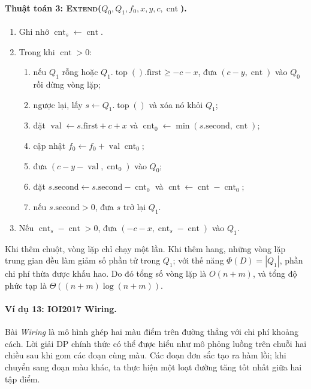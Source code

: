 \documentclass[11pt]{article}
\begin{document}
\paragraph{Thuật toán 3: \textsc{Extend}(\(Q_0,Q_1,f_0,x,y,c,\operatorname{cnt}\)).}
\begin{enumerate}
  \item Ghi nhớ \(\operatorname{cnt}_s\leftarrow \operatorname{cnt}\).
  \item Trong khi \(\operatorname{cnt}>0\):
  \begin{enumerate}
    \item nếu \(Q_1\) rỗng hoặc
    \(Q_1.\operatorname{top}().\mathrm{first}\ge -c-x\), đưa
    \((c-y,\operatorname{cnt})\) vào \(Q_0\) rồi dừng vòng lặp;
    \item ngược lại, lấy \(s\leftarrow Q_1.\operatorname{top}()\) và xóa nó
    khỏi \(Q_1\);
    \item đặt \(\operatorname{val}\leftarrow s.\mathrm{first}+c+x\) và
    \(\operatorname{cnt}_0\leftarrow
    \min(s.\mathrm{second},\operatorname{cnt})\);
    \item cập nhật \(f_0\leftarrow f_0+\operatorname{val}\operatorname{cnt}_0\);
    \item đưa \((c-y-\operatorname{val},\operatorname{cnt}_0)\) vào \(Q_0\);
    \item đặt
    \(s.\mathrm{second}\leftarrow s.\mathrm{second}-\operatorname{cnt}_0\) và
    \(\operatorname{cnt}\leftarrow \operatorname{cnt}-\operatorname{cnt}_0\);
    \item nếu \(s.\mathrm{second}>0\), đưa \(s\) trở lại \(Q_1\).
  \end{enumerate}
  \item Nếu \(\operatorname{cnt}_s-\operatorname{cnt}>0\), đưa
  \((-c-x,\operatorname{cnt}_s-\operatorname{cnt})\) vào \(Q_1\).
\end{enumerate}
Khi thêm chuột, vòng lặp chỉ chạy một lần. Khi thêm hang, những vòng lặp trung
gian đều làm giảm số phần tử trong \(Q_1\); với thế năng
\(\Phi(D)=|Q_1|\), phần chi phí thừa được khấu hao. Do đó tổng số vòng lặp là
\(O(n+m)\), và tổng độ phức tạp là
\(\Theta((n+m)\log(n+m))\).

\paragraph{Ví dụ 13: IOI2017 Wiring.}
Bài \emph{Wiring} là mô hình ghép hai màu điểm trên đường thẳng với chi phí
khoảng cách. Lời giải DP chính thức có thể được hiểu như mô phỏng luồng trên
chuỗi hai chiều sau khi gom các đoạn cùng màu. Các đoạn đơn sắc tạo ra hàm lồi;
khi chuyển sang đoạn màu khác, ta thực hiện một loạt đường tăng tốt nhất giữa
hai tập điểm.
\end{document}
